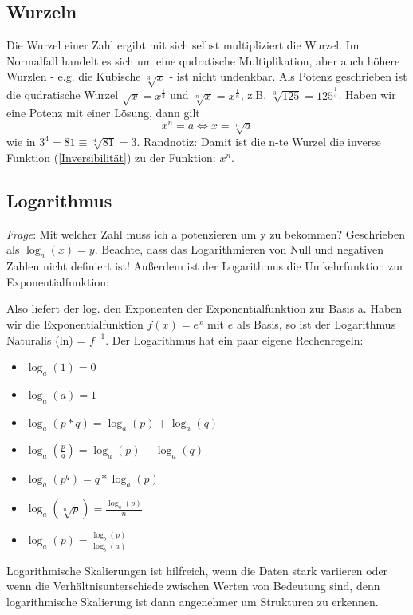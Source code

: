 \documentclass[letterpaper, titlepage]{article}
\begin{document}
\vspace{0.35cm}

\subsection{Wurzeln}\label{Wurzeln}
Die Wurzel einer Zahl ergibt mit sich selbst multipliziert die Wurzel. Im Normalfall handelt es sich um eine qudratische Multiplikation, aber auch höhere Wurzlen - e.g. die Kubische $\sqrt[3]{x}$ - ist nicht undenkbar. Als Potenz geschrieben ist die qudratische Wurzel $\sqrt{x}=x^{\frac{1}{2}}$ und $\sqrt[n]{x}=x^{\frac{1}{n}}$, z.B. $\sqrt[3]{125} = 125^{\frac{1}{3}}$.
Haben wir eine Potenz mit einer Lösung, dann gilt $$x^n=a \Leftrightarrow x=\sqrt[n]{a}$$  wie in $3^4 = 81 \equiv \sqrt[4]{81} = 3.$
Randnotiz: Damit ist die n-te Wurzel die inverse Funktion (\ref{Inversibilität}) zu der Funktion: $x^n$.

\vspace{0.35cm}

\subsection{Logarithmus}\label{Logarithmus}
\textit{Frage}: Mit welcher Zahl muss ich a potenzieren um y zu bekommen? Geschrieben als $\log_a(x)=y$. Beachte, dass das Logarithmieren von Null und negativen Zahlen nicht definiert ist! 
\skiptwolines
Außerdem ist der Logarithmus die Umkehrfunktion zur Exponentialfunktion:
 
Also liefert der log. den Exponenten der Exponentialfunktion zur Basis a. Haben wir die Exponentialfunktion $f(x)=e^x$ mit $e$ als Basis, so ist der Logarithmus Naturalis (ln) = $f^{-1}$. Der Logarithmus hat ein paar eigene Rechenregeln:\\
\begin{itemize}
    \item $\log_a(1)=0$
    \item $\log_a(a)=1$
    \item $\log_a(p*q)=\log_a(p)+\log_a(q)$
    \item $\log_a(\frac{p}{q})=\log_a(p)-\log_a(q)$
    \item $\log_a(p^q)=q*\log_a(p)$
    \item $\log_a(\sqrt[n]{p})=\frac{\log_a(p)}{n}$
    \item $\log_a(p)=\frac{\log_b(p)}{\log_b(a)}$
\end{itemize}
\vspace{0.6cm}
Logarithmische Skalierungen ist hilfreich, wenn die Daten stark variieren oder wenn die Verhältnisunterschiede zwischen Werten von Bedeutung sind, denn logarithmische Skalierung ist dann angenehmer um Strukturen zu erkennen.
\end{document}
